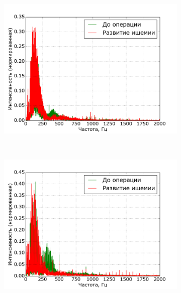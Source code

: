 \documentclass[a4paper,12pt]{extarticle}
\begin{document}
\begin{figure}[H]
    \centering
    \begin{subfigure}[b]{0.31\textwidth}
       \includegraphics[width=\textwidth]{img/ft_comparison_mouse_1.png}
    \end{subfigure}
    ~
    \begin{subfigure}[b]{0.31\textwidth}
       \includegraphics[width=\textwidth]{img/ft_comparison_mouse_16.png}
    \end{subfigure}
    ~
    \begin{subfigure}[b]{0.31\textwidth}

\end{subfigure}
\end{figure}
\end{document}
